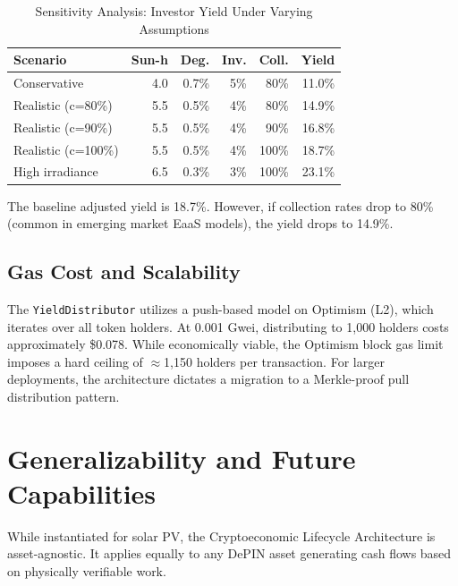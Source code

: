 \documentclass[conference]{IEEEtran}
\begin{document}
\begin{table}[h]
\caption{Sensitivity Analysis: Investor Yield Under Varying Assumptions}
\label{tab:sensitivity}
\begin{center}
\renewcommand{\arraystretch}{1.2}
\begin{tabular}{p{2.2cm}rrrrr}
\toprule
\textbf{Scenario} & \textbf{Sun-h} & \textbf{Deg.} & \textbf{Inv.} & \textbf{Coll.} & \textbf{Yield} \\
\midrule
Conservative     & 4.0 & 0.7\% & 5\% & 80\% & 11.0\% \\
Realistic (c=80\%) & 5.5 & 0.5\% & 4\% & 80\% & 14.9\% \\
Realistic (c=90\%) & 5.5 & 0.5\% & 4\% & 90\% & 16.8\% \\
Realistic (c=100\%)& 5.5 & 0.5\% & 4\% & 100\% & 18.7\% \\
High irradiance  & 6.5 & 0.3\% & 3\% & 100\% & 23.1\% \\
\bottomrule
\end{tabular}
\end{center}
\end{table}

The baseline adjusted yield is 18.7\%. However, if collection rates drop to 80\% (common in emerging market EaaS models), the yield drops to 14.9\%. 

\subsection{Gas Cost and Scalability}
The \texttt{YieldDistributor} utilizes a push-based model on Optimism (L2), which iterates over all token holders. At 0.001 Gwei, distributing to 1,000 holders costs approximately \$0.078. While economically viable, the Optimism block gas limit imposes a hard ceiling of $\approx$1,150 holders per transaction. For larger deployments, the architecture dictates a migration to a Merkle-proof pull distribution pattern.

\section{Generalizability and Future Capabilities}
\label{sec:generalizability}

While instantiated for solar PV, the Cryptoeconomic Lifecycle Architecture is asset-agnostic. It applies equally to any DePIN asset generating cash flows based on physically verifiable work.
\end{document}
